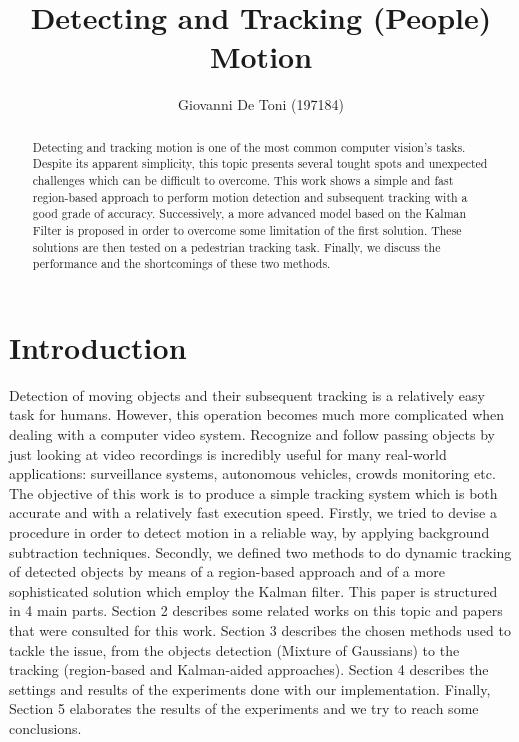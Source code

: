 \documentclass[runningheads]{llncs}
\begin{document}
%
\title{Detecting and Tracking (People) Motion}
%
%
\author{Giovanni De Toni (197184)}
%
%
%
\maketitle              %
%
\begin{abstract}
Detecting and tracking motion is one of the most common computer vision's tasks. Despite its apparent simplicity, this topic presents several tought spots and unexpected challenges which can be difficult to overcome. This work shows a simple and fast region-based approach to perform motion detection and subsequent tracking with a good grade of accuracy. Successively, a more advanced model based on the Kalman Filter is proposed in order to overcome some limitation of the first solution. These solutions are then tested on a pedestrian tracking task. Finally, we discuss the performance and the shortcomings of these two methods. 

\end{abstract}
%
%
%
\section{Introduction}
Detection of moving objects and their subsequent tracking is a relatively easy task for humans. However, this operation becomes much more complicated when dealing with a computer video system. Recognize and follow passing objects by just looking at video recordings is incredibly useful for many real-world applications: surveillance systems, autonomous vehicles, crowds monitoring etc. The objective of this work is to produce a simple tracking system which is both accurate and with a relatively fast execution speed. Firstly, we tried to devise a procedure in order to detect motion in a reliable way, by applying background subtraction techniques. Secondly, we defined two methods to do dynamic tracking of detected objects by means of a region-based approach and of a more sophisticated solution which employ the Kalman filter.
This paper is structured in 4 main parts. Section 2 describes some related works on this topic and papers that were consulted for this work. Section 3 describes the chosen methods used to tackle the issue, from the objects detection (Mixture of Gaussians) to the tracking (region-based and Kalman-aided approaches). Section 4 describes the settings and results of the experiments done with our implementation. Finally, Section 5 elaborates the results of the experiments and we try to reach some conclusions.
\end{document}
